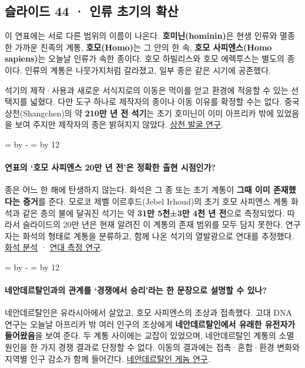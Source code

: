 \documentclass[10pt,a4paper]{article}
\newcommand{\ReserveQuestionSpace}{%
  \par\begingroup
  \dimen0=\pagegoal \advance\dimen0 by -\pagetotal
  \dimen2=\baselineskip \multiply\dimen2 by 12
  \ifdim\dimen0<\dimen2 \newpage\fi
  \endgroup}
\begin{document}
\subsection{슬라이드 44 · 인류 초기의 확산}
이 연표에는 서로 다른 범위의 이름이 나온다. \textbf{호미닌(hominin)}은 현생 인류와 멸종한 가까운 친족의 계통, \textbf{호모(Homo)}는 그 안의 한 속, \textbf{호모 사피엔스(Homo sapiens)}는 오늘날 인류가 속한 종이다. 호모 하빌리스와 호모 에렉투스는 별도의 종이다. 인류의 계통은 나뭇가지처럼 갈라졌고, 일부 종은 같은 시기에 공존했다.\par

석기의 제작·사용과 새로운 서식지로의 이동은 먹이를 얻고 환경에 적응할 수 있는 선택지를 넓혔다. 다만 도구 하나로 제작자의 종이나 이동 이유를 확정할 수는 없다. 중국 상천(Shangchen)의 약 \textbf{210만 년 전 석기}는 초기 호미닌이 이미 아프리카 밖에 있었음을 보여 주지만 제작자의 종은 밝혀지지 않았다. \href{https://www.nature.com/articles/s41586-018-0299-4}{상천 발굴 연구}.\par

\ReserveQuestionSpace
\paragraph{연표의 ‘호모 사피엔스 20만 년 전’은 정확한 출현 시점인가?}
종은 어느 한 해에 탄생하지 않는다. 화석은 그 종 또는 초기 계통이 \textbf{그때 이미 존재했다는 증거}를 준다. 모로코 제벨 이르후드(Jebel Irhoud)의 초기 호모 사피엔스 계통 화석과 같은 층의 불에 달궈진 석기는 약 \textbf{31만 5천±3만 4천 년 전}으로 측정되었다. 따라서 슬라이드의 20만 년은 현재 알려진 이 계통의 존재 범위를 모두 담지 못한다. 연구자는 화석의 형태로 계통을 분류하고, 함께 나온 석기의 열발광으로 연대를 추정했다. \href{https://www.nature.com/articles/nature22336}{화석 분석} · \href{https://www.nature.com/articles/nature22335}{연대 측정 연구}.\par

\ReserveQuestionSpace
\paragraph{네안데르탈인과의 관계를 ‘경쟁에서 승리’라는 한 문장으로 설명할 수 있나?}
네안데르탈인은 유라시아에서 살았고, 호모 사피엔스의 조상과 접촉했다. 고대 DNA 연구는 오늘날 아프리카 밖 여러 인구의 조상에게 \textbf{네안데르탈인에서 유래한 유전자가 들어왔음}을 보여 준다. 두 계통 사이에는 교잡이 있었으며, 네안데르탈인 계통의 소멸 원인을 한 가지 경쟁 결과로 단정할 수 없다. 이동의 결과에는 접촉·혼합·환경 변화와 지역별 인구 감소가 함께 들어간다. \href{https://pmc.ncbi.nlm.nih.gov/articles/PMC5100745/}{네안데르탈인 게놈 연구}.\par
\end{document}
